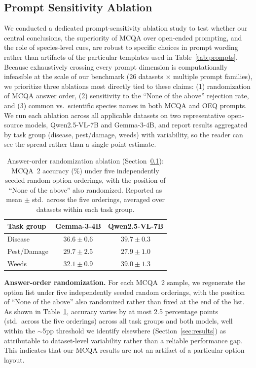 \documentclass[10pt,letterpaper]{article}
\begin{document}
\subsection{Prompt Sensitivity Ablation}
\label{sec:prompt_sensitivity}

We conducted a dedicated prompt-sensitivity ablation study to test whether our central conclusions, the superiority of MCQA over open-ended prompting, and the role of species-level cues, are robust to specific choices in prompt wording rather than artifacts of the particular templates used in Table~\ref{tab:prompts}. Because exhaustively crossing every prompt dimension is computationally infeasible at the scale of our benchmark (26 datasets $\times$ multiple prompt families), we prioritize three ablations most directly tied to these claims: (1) randomization of MCQA answer order, (2) sensitivity to the ``None of the above'' rejection rate, and (3) common vs.\ scientific species names in both MCQA and OEQ prompts. We run each ablation across all applicable datasets on two representative open-source models, Qwen2.5-VL-7B and Gemma-3-4B, and report results aggregated by task group (disease, pest/damage, weeds) with variability, so the reader can see the spread rather than a single point estimate.

\begin{table}[t]
\centering
\caption{Answer-order randomization ablation (Section~\ref{sec:prompt_sensitivity}): MCQA~2 accuracy (\%) under five independently seeded random option orderings, with the position of ``None of the above'' also randomized. Reported as mean $\pm$ std.\ across the five orderings, averaged over datasets within each task group.}
\label{tab:ablation_order}
\renewcommand{\arraystretch}{1.2}
\footnotesize
\begin{tabular}{lcc}
\toprule
\textbf{Task group} & \textbf{Gemma-3-4B} & \textbf{Qwen2.5-VL-7B} \\
\midrule
Disease & $36.6 \pm 0.6$ & $39.7 \pm 0.3$ \\
Pest/Damage & $29.7 \pm 2.5$ & $27.9 \pm 1.0$ \\
Weeds & $32.1 \pm 0.9$ & $39.0 \pm 1.3$ \\
\bottomrule
\end{tabular}
\end{table}

\textbf{Answer-order randomization.} For each MCQA~2 sample, we regenerate the option list under five independently seeded random orderings, with the position of ``None of the above'' also randomized rather than fixed at the end of the list. As shown in Table~\ref{tab:ablation_order}, accuracy varies by at most 2.5 percentage points (std.\ across the five orderings) across all task groups and both models, well within the $\sim$5pp threshold we identify elsewhere (Section~\ref{sec:results}) as attributable to dataset-level variability rather than a reliable performance gap. This indicates that our MCQA results are not an artifact of a particular option layout.
\end{document}
